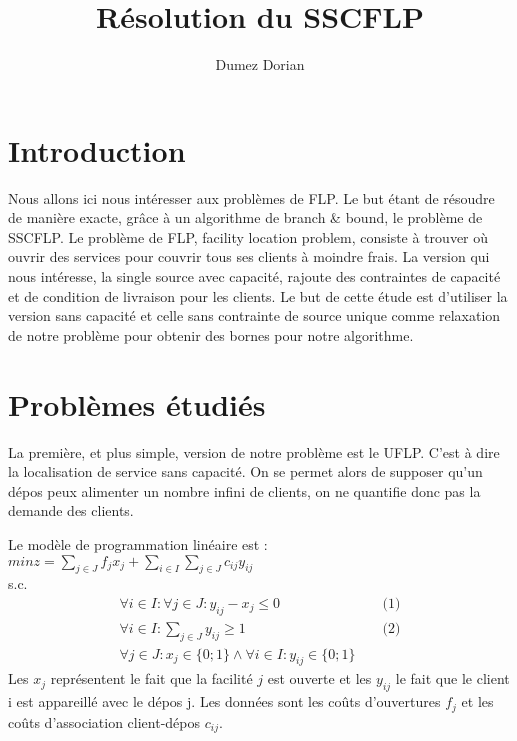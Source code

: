 \documentclass[12pt,a4paper]{article}
\begin{document}
\title{Résolution du SSCFLP}

\author{Dumez Dorian}

\maketitle

\section*{Introduction}

Nous allons ici nous intéresser aux problèmes de FLP. Le but étant de résoudre de manière exacte, grâce à un algorithme de branch \& bound, le problème de SSCFLP. Le problème de FLP, facility location problem, consiste à trouver où ouvrir des services pour couvrir tous ses clients à moindre frais. La version qui nous intéresse, la single source avec capacité, rajoute des contraintes de capacité et de condition de livraison pour les clients. Le but de cette étude est d'utiliser la version sans capacité et celle sans contrainte de source unique comme relaxation de notre problème pour obtenir des bornes pour notre algorithme. 

\section{Problèmes étudiés}

La première, et plus simple, version de notre problème est le UFLP. C'est à dire la localisation de service sans capacité. On se permet alors de supposer qu'un dépos peux alimenter un nombre infini de clients, on ne quantifie donc pas la demande des clients.

Le modèle de programmation linéaire est :\\
$min z = \sum \limits_{j \in J} f_j x_j + \sum \limits_{i \in I} \sum \limits_{j \in J} c_{ij} y_{ij}$\\
s.c.
\begin{align*}
 \forall i \in I : \forall j \in J : y_{ij} - x_j \leqslant 0 & & \text{ (1)} \\
 \forall i \in I : \sum \limits_{j \in J} y_{ij} \geqslant 1 & & \text{ (2)} \\
 \forall j \in J : x_j \in \{0;1\} \land \forall i \in I  : y_{ij} \in \{0;1\} 
\end{align*}
Les $x_j$ représentent le fait que la facilité $j$ est ouverte et les $y_{ij}$ le fait que le client i est appareillé avec le dépos j. Les données sont les coûts d'ouvertures $f_j$ et les coûts d'association client-dépos $c_{ij}$.
\end{document}
